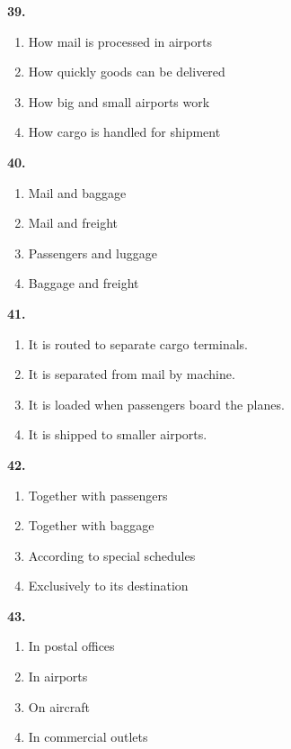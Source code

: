 \documentclass[12pt]{article}
\begin{document}
\noindent\textbf{39.}
\begin{enumerate}[label=(\Alph*),leftmargin=*,itemsep=0.2em]
\item How mail is processed in airports
\item How quickly goods can be delivered
\item How big and small airports work
\item How cargo is handled for shipment
\end{enumerate}
\par
\vspace{0.25\baselineskip}
\noindent\textbf{40.}
\begin{enumerate}[label=(\Alph*),leftmargin=*,itemsep=0.2em]
\item Mail and baggage
\item Mail and freight
\item Passengers and luggage
\item Baggage and freight
\end{enumerate}
\par
\vspace{0.25\baselineskip}
\noindent\textbf{41.}
\begin{enumerate}[label=(\Alph*),leftmargin=*,itemsep=0.2em]
\item It is routed to separate cargo terminals.
\item It is separated from mail by machine.
\item It is loaded when passengers board the planes.
\item It is shipped to smaller airports.
\end{enumerate}
\par
\vspace{0.25\baselineskip}
\noindent\textbf{42.}
\begin{enumerate}[label=(\Alph*),leftmargin=*,itemsep=0.2em]
\item Together with passengers
\item Together with baggage
\item According to special schedules
\item Exclusively to its destination
\end{enumerate}
\par
\vspace{0.25\baselineskip}
\noindent\textbf{43.}
\begin{enumerate}[label=(\Alph*),leftmargin=*,itemsep=0.2em]
\item In postal offices
\item In airports
\item On aircraft
\item In commercial outlets
\end{enumerate}
\end{document}
